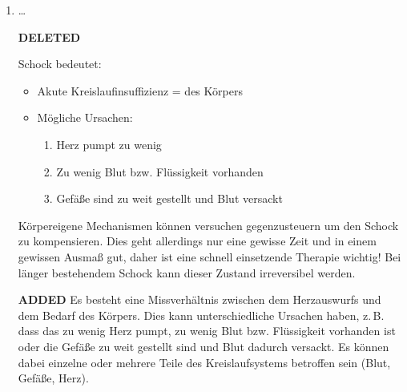 \documentclass[
ngerman,
paper=a4,
asymmetric,
fontsize=10pt,
headings=small,
draft=false,
numbers=noenddot,
bibtotocnumbered,
footnotes=multiple,
]{scrreprt}
\newcommand{\jALT}{{\color{red}\sffamily\textbf{DELETED}\hrulefill\newline\newline}}
\newcommand{\jALTende}{\newline{\color{red}\rule{\linewidth}{2pt}\newline}}
\newcommand{\jNEU}{{\color{green}\sffamily\textbf{ADDED}\hrulefill\newline\newline}}
\begin{document}
\begin{enumerate}
\item \ldots

\jALT
{}


\noindent Schock bedeutet:

\begin{itemize}
  \item Akute Kreislaufinsuffizienz =
   des Körpers
  \item Mögliche Ursachen:
  \begin{enumerate}
    \item Herz pumpt zu wenig
    \item Zu wenig Blut bzw. Flüssigkeit vorhanden
    \item Gefäße sind zu weit gestellt und Blut versackt
  \end{enumerate}
\end{itemize}

 
Körpereigene Mechanismen können versuchen gegenzusteuern um
den Schock zu kompensieren. Dies geht allerdings nur eine
gewisse Zeit und in einem gewissen Ausmaß gut, daher ist
eine schnell  einsetzende Therapie wichtig! Bei länger
bestehendem Schock kann dieser Zustand irreversibel werden.
\jALTende

\jNEU
{} Es besteht eine
Missverhältnis zwischen dem Herzauswurfs und dem Bedarf des
Körpers. Dies kann unterschiedliche Ursachen haben, z.\,B.
dass das  zu wenig Herz pumpt, zu wenig Blut bzw.
Flüssigkeit vorhanden ist oder die Gefäße zu weit gestellt
sind und Blut dadurch versackt.
Es können dabei einzelne oder mehrere Teile des
Kreislaufsystems betroffen sein  (Blut, Gefäße, Herz). 
 

\end{enumerate}
\end{document}
